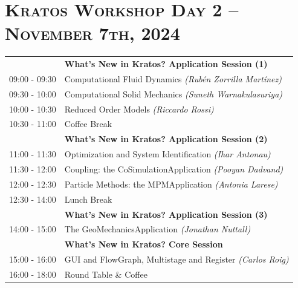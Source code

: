 \documentclass{article}
\begin{document}
\newpage
\section*{\centering \textsc{Kratos Workshop Day 2 -- November 7th, 2024}}

\begin{table}[h]\centering
   \begin{tabularx}{0.85\textwidth}{r|X}
      \toprule%
                    & {\large \textbf{What's New in Kratos? Application Session (1)}} \\%
      09:00 - 09:30 & Computational Fluid Dynamics \textit{(Rubén Zorrilla Martínez)}\\%
      09:30 - 10:00 & Computational Solid Mechanics \textit{(Suneth Warnakulasuriya)}\\%
      10:00 - 10:30 & Reduced Order Models \textit{(Riccardo Rossi)}\\%
      \midrule%
      \rowcolor{SeaGreen3!5!} 10:30 - 11:00 & Coffee Break \\%
      \midrule%
                    & {\large \textbf{What's New in Kratos? Application Session (2)}} \\%
      11:00 - 11:30 & Optimization and System Identification \textit{(Ihar Antonau)} \\%
      11:30 - 12:00 & Coupling: the CoSimulationApplication \textit{(Pooyan Dadvand)}\\%
      12:00 - 12:30 & Particle Methods: the MPMApplication \textit{(Antonia Larese)}\\%
      \midrule%
      \rowcolor{SeaGreen3!5!} 12:30 - 14:00 & Lunch Break \\%
      \midrule%
                    & {\large \textbf{What's New in Kratos? Application Session (3)}} \\%
      14:00 - 15:00 & The GeoMechanicsApplication \textit{(Jonathan Nuttall)}\\%
      \midrule%
                    & {\large \textbf{What's New in Kratos? Core Session}} \\%
      15:00 - 16:00 & GUI and FlowGraph, Multistage and Register \textit{(Carlos Roig)}\\%
      \midrule%
      16:00 - 18:00 & Round Table \& Coffee \\%
      \bottomrule
   \end{tabularx}
\end{table}
\end{document}
